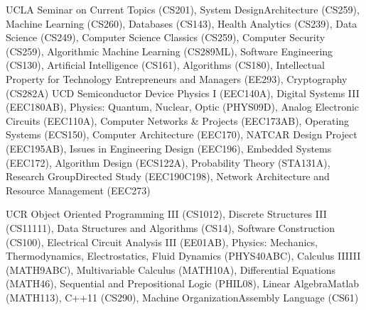 

\begin{cvskills}

  \cvskill
    {UCLA} %
    {Seminar on Current Topics (CS201), System Design\/Architecture (CS259), Machine Learning (CS260), Databases (CS143), Health Analytics (CS239), Data Science (CS249), Computer Science Classics (CS259), Computer Security (CS259), Algorithmic Machine Learning (CS289ML), Software Engineering (CS130), Artificial Intelligence (CS161), Algorithms (CS180), Intellectual Property for Technology Entrepreneurs and Managers (EE293), Cryptography (CS282A)}
  \cvskill
    {UCD} %
    {Semiconductor Device Physics I (EEC140A), Digital Systems I\/II (EEC180A\/B), Physics: Quantum, Nuclear, Optic (PHYS09D), Analog Electronic Circuits (EEC110A), Computer Networks \& Projects (EEC173A\/B), Operating Systems (ECS150), Computer Architecture (EEC170), NATCAR Design Project (EEC195A\/B), Issues in Engineering Design (EEC196), Embedded Systems (EEC172), Algorithm Design (ECS122A), Probability Theory (STA131A), Research Group\/Directed Study (EEC190C\/198), Network Architecture and Resource Management (EEC273)} %

  \cvskill
    {UCR} %
    {Object Oriented Programming I\/II (CS10\/12), Discrete Structures I\/II (CS11\/111), Data Structures and Algorithms (CS14), Software Construction (CS100), Electrical Circuit Analysis I\/II (EE01A\/B), Physics: Mechanics, Thermodynamics, Electrostatics, Fluid Dynamics (PHYS40A\/B\/C), Calculus I\/II\/III (MATH9A\/B\/C), Multivariable Calculus (MATH10A), Differential Equations (MATH46), Sequential and Prepositional Logic (PHIL08), Linear Algebra\/Matlab (MATH113), C++11 (CS290), Machine Organization\/Assembly Language (CS61)} %

\end{cvskills}
